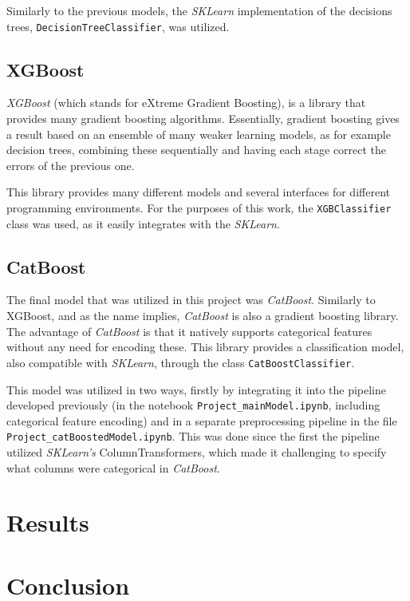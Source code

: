 \documentclass{IEEEtran}
\begin{document}
Similarly to the previous models, the \textit{SKLearn} implementation of the decisions trees, \texttt{DecisionTreeClassifier}, was utilized.

\subsection{XGBoost}

\textit{XGBoost} (which stands for eXtreme Gradient Boosting), is a library that provides many gradient boosting algorithms. Essentially, gradient boosting gives a result based on an ensemble of many weaker learning models, as for example decision trees, combining these sequentially and having each stage correct the errors of the previous one.

This library provides many different models and several interfaces for different programming environments. For the purposes of this work, the \texttt{XGBClassifier} class was used, as it easily integrates with the \textit{SKLearn}.

\subsection{CatBoost}

The final model that was utilized in this project was \textit{CatBoost}. Similarly to XGBoost, and as the name implies, \textit{CatBoost} is also a gradient boosting library. The advantage of \textit{CatBoost} is that it natively supports categorical features without any need for encoding these. This library provides a classification model, also compatible with \textit{SKLearn}, through the class \texttt{CatBoostClassifier}.

This model was utilized in two ways, firstly by integrating it into the pipeline developed previously (in the notebook \texttt{Project\_mainModel.ipynb}, including categorical feature encoding) and in a separate preprocessing pipeline in the file \texttt{Project\_catBoostedModel.ipynb}. This was done since the first the pipeline utilized \textit{SKLearn's} ColumnTransformers, which made it challenging to specify what columns were categorical in \textit{CatBoost}.

\section{Results}



\section{Conclusion}
\end{document}
